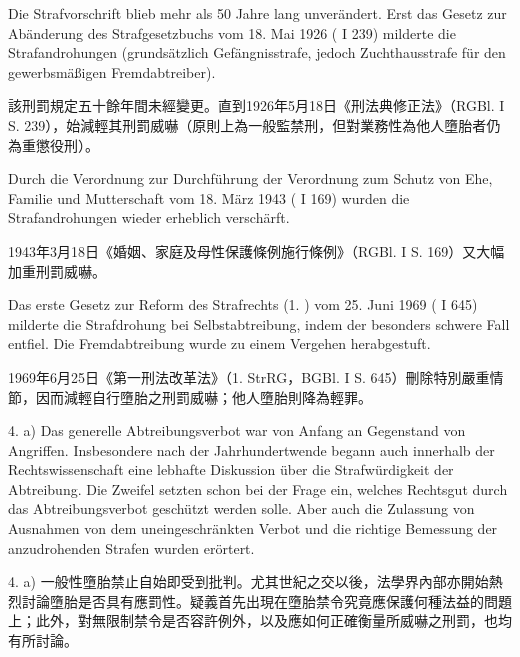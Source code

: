 \documentclass[12pt]{article}
\begin{document}
\syncleft
\begin{sourcepara}
Die Strafvorschrift blieb mehr als 50 Jahre lang unverändert. Erst das Gesetz zur Abänderung des Strafgesetzbuchs vom 18. Mai 1926 (\abbrRGBl{} I \abbrS{} 239) milderte die Strafandrohungen (grundsätzlich Gefängnisstrafe, jedoch Zuchthausstrafe für den gewerbsmäßigen Fremdabtreiber).
\end{sourcepara}
\begin{transpara}
該刑罰規定五十餘年間未經變更。直到1926年5月18日《刑法典修正法》（RGBl. I S. 239），始減輕其刑罰威嚇（原則上為一般監禁刑，但對業務性為他人墮胎者仍為重懲役刑）。
\end{transpara}

\syncleft
\begin{sourcepara}
Durch die Verordnung zur Durchführung der Verordnung zum Schutz von Ehe, Familie und Mutterschaft vom 18. März 1943 (\abbrRGBl{} I \abbrS{} 169) wurden die Strafandrohungen wieder erheblich verschärft.
\end{sourcepara}
\begin{transpara}
1943年3月18日《婚姻、家庭及母性保護條例施行條例》（RGBl. I S. 169）又大幅加重刑罰威嚇。
\end{transpara}

\syncleft
\begin{sourcepara}
Das erste Gesetz zur Reform des Strafrechts (1. \abbrStrRG{}) vom 25. Juni 1969 (\abbrBGBl{} I \abbrS{} 645) milderte die Strafdrohung bei Selbstabtreibung, indem der besonders schwere Fall entfiel. Die Fremdabtreibung wurde zu einem Vergehen herabgestuft.
\end{sourcepara}
\begin{transpara}
1969年6月25日《第一刑法改革法》（1. StrRG，BGBl. I S. 645）刪除特別嚴重情節，因而減輕自行墮胎之刑罰威嚇；他人墮胎則降為輕罪。
\end{transpara}

\syncleft
\begin{sourcepara}
4. a) Das generelle Abtreibungsverbot war von Anfang an Gegenstand von Angriffen. Insbesondere nach der Jahrhundertwende begann auch innerhalb der Rechtswissenschaft eine lebhafte Diskussion über die Strafwürdigkeit der Abtreibung. Die Zweifel setzten schon bei der Frage ein, welches Rechtsgut durch das Abtreibungsverbot geschützt werden solle. Aber auch die Zulassung von Ausnahmen von dem uneingeschränkten Verbot und die richtige Bemessung der anzudrohenden Strafen wurden erörtert.
\end{sourcepara}
\begin{transpara}
4. a) 一般性墮胎禁止自始即受到批判。尤其世紀之交以後，法學界內部亦開始熱烈討論墮胎是否具有應罰性。疑義首先出現在墮胎禁令究竟應保護何種法益的問題上；此外，對無限制禁令是否容許例外，以及應如何正確衡量所威嚇之刑罰，也均有所討論。
\end{transpara}
\end{document}
